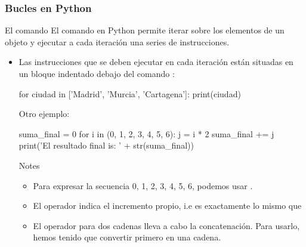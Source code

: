 \documentclass[handout,9pt]{beamer}
\begin{document}
\begin{frame}[fragile]
  \frametitle{Bucles en Python}
  \begin{block}{El comando }
    El comando  en Python permite iterar sobre los elementos
    de un objeto y ejecutar a cada iteración una series de instrucciones.
  \end{block}\pause
  \begin{itemize}
  \item Las instrucciones que se deben ejecutar en cada iteración
    están situadas en un bloque indentado debajo del comando :\\
    \begin{pyverbatim}
for ciudad in ['Madrid', 'Murcia', 'Cartagena']:
    print(ciudad)
  \end{pyverbatim}
  \pause
 Otro ejemplo:\smallskip
 \begin{pyblock}
suma_final = 0
for i in (0, 1, 2, 3, 4, 5, 6):
    j = i * 2
    suma_final += j
print('El resultado final is: ' + str(suma_final))
\end{pyblock}
\pause
  \begin{block}{Notes}
    \begin{itemize}
    \item Para expresar la secuencia 0, 1, 2, 3, 4, 5, 6, podemos usar
      .    
      \item El operador \pyv{+=} indica el incremento propio, i.e
         es exactamente lo mismo que 
      \item El operador \pyv{+} para dos cadenas lleva a cabo la
        concatenación. Para usarlo, hemos tenido que convertir primero
                 en una cadena.
    \end{itemize}
  \end{block}
  \end{itemize}
\end{frame}
\end{document}
